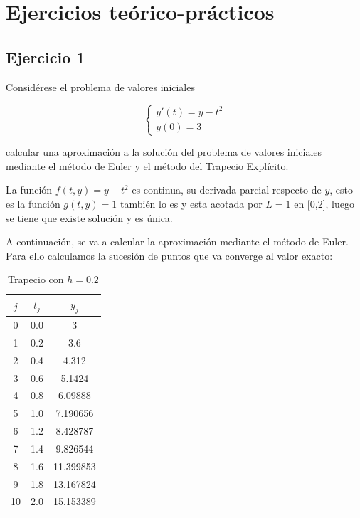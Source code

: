 \documentclass{article}
\theoremstyle{theorem-style}  %
\theoremstyle{definition-style}
\theoremstyle{example-style}
\begin{document}
\section{Ejercicios teórico-prácticos}

\subsection{Ejercicio 1}

Considérese el problema de valores iniciales 

		\begin{equation*}
			\begin{cases}
				y'(t) = y - t^2 \\
				y(0) = 3 
			\end{cases}
		\end{equation*}

calcular una aproximación a la solución del problema de valores iniciales mediante el método de Euler y el método del Trapecio Explícito.

La función $f(t,y) = y - t^2$ es continua, su derivada parcial respecto de $y$, esto es la función $g(t,y) = 1$ también lo es y esta acotada por $L=1$ en [0,2], luego se tiene que existe solución y es única.

A continuación, se va a calcular la aproximación mediante el método de Euler. Para ello calculamos la sucesión de puntos que va converge al valor exacto:

	\begin{table}[H]
		\centering
		\begin{tabular}{|| c | c | c ||}
			\hline
			\hline $j$ &  $t_j $ & $y_j$\\
			\hline 0 & 0.0 & 3 \\
			\hline 1 & 0.2 & 3.6  \\
			\hline 2 & 0.4 & 4.312 \\
			\hline 3 & 0.6 & 5.1424 \\
			\hline 4 & 0.8 & 6.09888 \\
			\hline 5 & 1.0 & 7.190656 \\
			\hline 6 & 1.2 & 8.428787 \\
			\hline 7 & 1.4 & 9.826544 \\
			\hline 8 & 1.6 & 11.399853 \\
			\hline 9 & 1.8 & 13.167824 \\
			\hline 10 & 2.0 & 15.153389 \\
		\end{tabular}
		\caption{Trapecio con $h=0.2$}
		\label{table:trapecio-ejtp1.1}
	\end{table}
\end{document}
